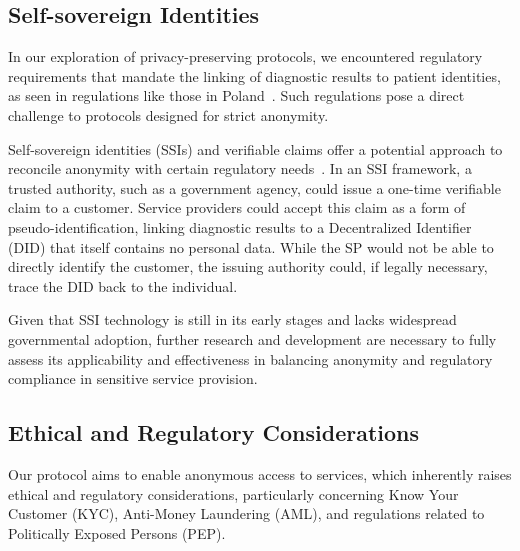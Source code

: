 \documentclass[pdftex,twocolumn,epjc3]{svjour3}
\begin{document}
\subsection{Self-sovereign Identities}
In our exploration of privacy-preserving protocols, we encountered regulatory requirements that mandate the linking of diagnostic results to patient identities, as seen in regulations like those in Poland~\cite{ministerstwozdrowiaRegulationMinisterHealth2006}. Such regulations pose a direct challenge to protocols designed for strict anonymity.

\begin{sloppypar}
Self-sovereign identities (SSIs) and verifiable claims offer a potential approach to reconcile anonymity with certain regulatory needs~\cite{muhleSurveyEssentialComponents2018}. In an SSI framework, a trusted authority, such as a government agency, could issue a one-time verifiable claim to a customer. Service providers could accept this claim as a form of pseudo-identification, linking diagnostic results to a Decentralized Identifier (DID) that itself contains no personal data. While the SP would not be able to directly identify the customer, the issuing authority could, if legally necessary, trace the DID back to the individual.
\end{sloppypar}

\begin{sloppypar}
Given that SSI technology is still in its early stages and lacks widespread governmental adoption, further research and development are necessary to fully assess its applicability and effectiveness in balancing anonymity and regulatory compliance in sensitive service provision.
\end{sloppypar}

\subsection{Ethical and Regulatory Considerations}

\begin{sloppypar}
Our protocol aims to enable anonymous access to services, which inherently raises ethical and regulatory considerations, particularly concerning Know Your Customer (KYC), Anti-Money Laundering (AML), and regulations related to Politically Exposed Persons (PEP).
\end{sloppypar}
\end{document}
